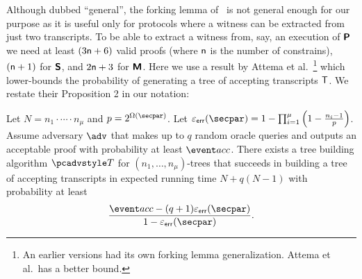 Although dubbed ``general'', the forking lemma of~\cite{CCS:BelNev06} is not general enough for our purpose as it is useful only for protocols where a witness can be extracted from just two transcripts. To be able to extract a witness from, say, an execution of $\bm{\mathsf{P}}$ we need at least $(3 \mathsf{n} + 6)$ valid proofs (where $\mathsf{n}$ is the number of constrains), $(\mathsf{n} + 1)$ for $\bm{\mathsf{S}}$, and $2 \mathsf{n} + 3$ for $\bm{\mathsf{M}}$.
 Here we use a result by Attema et
al.~\cite{EPRINT:AttFehKlo21short}\footnote{An earlier versions had its own forking lemma generalization. Attema et al.\ has a better bound.}  which lower-bounds the probability of generating a tree of accepting transcripts $\mathsf{T}$. We restate their Proposition 2 in our notation:

  \begin{lemma}\label{lem:attema}
	Let $N = n_1 \cdot \cdots \cdot n_\mu$ and $p = 2^{\Omega(\secpar)}$. Let $\epserr(\secpar) = 1 - \prod_{i=1}^{\mu}\left(1 - \frac{n_i - 1}{p}\right)$.
	Assume adversary $\adv$ that makes up to $q$ random
	oracle queries and outputs an acceptable proof with probability at least
	$\accProb$. There exists a tree building algorithm $\tdv$ for $(n_1, \ldots, n_\mu)$-trees that %
	succeeds in building a
	tree of accepting transcripts in expected
	running time $N + q (N - 1)$ with probability at least
	\[
	\frac{\accProb - (q + 1) \epserr (\secpar)}{1 - \epserr (\secpar)}.
	\]
	\end{lemma}

